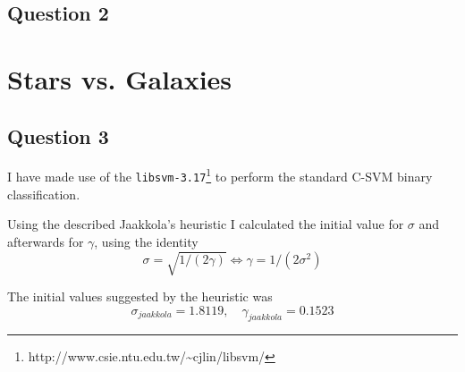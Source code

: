 \documentclass[a4paper, 11pt]{article}
\begin{document}
\subsection*{Question 2} %
 %


\section{Stars vs. Galaxies} %
\label{sec:stars_vs_galaxies}

\subsection*{Question 3}
I have made use of the \texttt{libsvm-3.17}\footnote{http://www.csie.ntu.edu.tw/\textasciitilde{}cjlin/libsvm/} to perform the standard C-SVM binary classification.

Using the described Jaakkola's heuristic I calculated the initial value for $\sigma$ and afterwards for $\gamma$, using the identity
\[
    \sigma = \sqrt{1 / (2 \gamma)} \Leftrightarrow \gamma = 1 / (2 \sigma^2)
\]

The initial values suggested by the heuristic was
\[
    \sigma_{\mathit{jaakkola}} = 1.8119,\quad \gamma_{\mathit{jaakkola}} = 0.1523
\]
\end{document}
